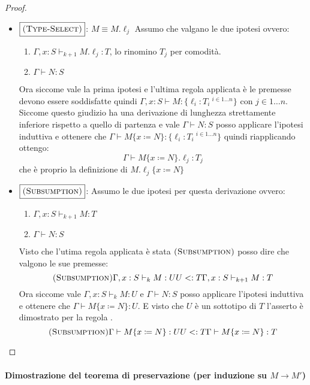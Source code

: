 \begin{proof}
\begin{itemize}
\begin{itemize}
\begin{itemize}
			\item $\boxed{\textsc{(Type-Select)}}$:
			$M \equiv M.\ell_j$
			Assumo che valgano le due ipotesi ovvero:
			\begin{enumerate}
				\item $\Gamma, x : S  \vdash_{k+1} M.\ell_j : T$, lo rinomino $T_j$ per comodit\`a.
				\item $\Gamma \vdash N : S$ 
			\end{enumerate}
			Ora siccome vale la prima ipotesi e l'ultima regola applicata \`e  le premesse devono essere soddisfatte
			quindi
			$\Gamma, x : S \vdash M : \{\ell_i : T_i\ ^{i \in 1 \dots n}\}$ con $j \in 1 \dots n$.
			Siccome questo giudizio ha una derivazione di lunghezza strettamente inferiore rispetto a quello di partenza  e vale
			$\Gamma \vdash N : S$ posso applicare l'ipotesi induttiva e ottenere che
			$\Gamma \vdash M\{x \coloneqq N \} : \{\ell_i : T_i\ ^{i \in 1 \dots n}\}$ quindi riapplicando  ottengo:
			$$
			\Gamma \vdash M\{x \coloneqq N \}.\ell_j : T_j
			$$
			che \`e proprio la definizione di $M.\ell_j \{x \coloneqq N \}$
			
			\item $\boxed{\textsc{(Subsumption)}}$: 
			Assumo le due ipotesi per questa derivazione ovvero:
			\begin{enumerate}
				\item $\Gamma, x : S \vdash_{k+1} M : T$
				\item $\Gamma \vdash N : S$
			\end{enumerate}
			Visto che l'utima regola applicata \`e stata $\textsc{(Subsumption)}$ posso dire che valgono le sue premesse:
			$$
			{\textsc{(Subsumption)}}
			{\Gamma, x : S \vdash_k M : U}
			{U <: T}
			{\Gamma, x : S \vdash_{k+1} M : T}
			$$
			Ora siccome vale $\Gamma, x : S \vdash_k M : U$ e $\Gamma \vdash N : S$ posso applicare l'ipotesi induttiva 
			e ottenere che $\Gamma \vdash M\{ x \coloneqq N \} : U $. 
			E visto che $U$ \`e un sottotipo di $T$ l'asserto \`e dimostrato per la regola .
			$$
			{\textsc{(Subsumption)}}
			{\Gamma \vdash M\{x \coloneqq N \} : U}
			{U <: T}
			{\Gamma \vdash M\{x \coloneqq N\} : T}
			$$
		\end{itemize}
	\end{itemize} 
\end{itemize}
	
	
\end{proof}


\paragraph{Dimostrazione del teorema di preservazione (per induzione su $M \to M'$)}

